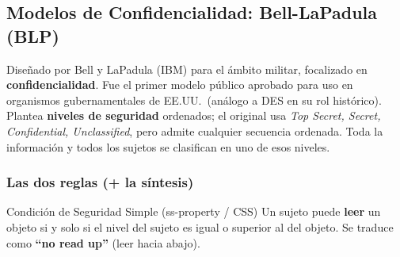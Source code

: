 \documentclass[../main.tex]{subfiles}
\begin{document}
\begin{center}
\end{center}

\subsection{Modelos de Confidencialidad: Bell-LaPadula (BLP)}

Diseñado por Bell y LaPadula (IBM) para el ámbito militar, focalizado en \textbf{confidencialidad}. Fue el primer modelo público aprobado para uso en organismos gubernamentales de EE.UU.\ (análogo a DES en su rol histórico). Plantea \textbf{niveles de seguridad} ordenados; el original usa \emph{Top Secret, Secret, Confidential, Unclassified}, pero admite cualquier secuencia ordenada. Toda la información y todos los sujetos se clasifican en uno de esos niveles.

\subsubsection{Las dos reglas (+ la síntesis)}

\begin{definicion}{Condición de Seguridad Simple (ss-property / CSS)}
Un sujeto puede \textbf{leer} un objeto si y solo si el nivel del sujeto es igual o superior al del objeto. Se traduce como \textbf{``no read up''} (leer hacia abajo).
\end{definicion}
\end{document}
